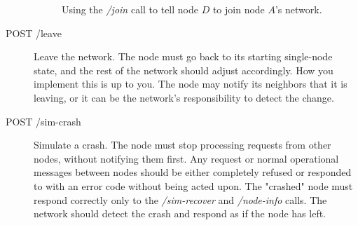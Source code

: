 \documentclass[]{article}
\begin{document}
\begin{description}
\begin{figure}[h!]

            \caption{Using the \textit{/join} call to tell node $D$ to join node $A$'s network.}
            \label{fig:join}

        \end{figure}

    \item[POST /leave]

        Leave the network.
        The node must go back to its starting single-node state,
        and the rest of the network should adjust accordingly.
        How you implement this is up to you.
        The node may notify its neighbors that it is leaving,
        or it can be the network's responsibility to detect the change.

    \item[POST /sim-crash]

        Simulate a crash.
        The node must stop processing requests from other nodes,
        without notifying them first.
        Any request or normal operational messages between nodes should be
        either completely refused or responded to with an error code
        without being acted upon.
        The "crashed" node must respond correctly only to the
        \textit{/sim-recover} and \textit{/node-info} calls.
        The network should detect the crash and respond as if
        the node has left.


\end{description}
\end{document}
